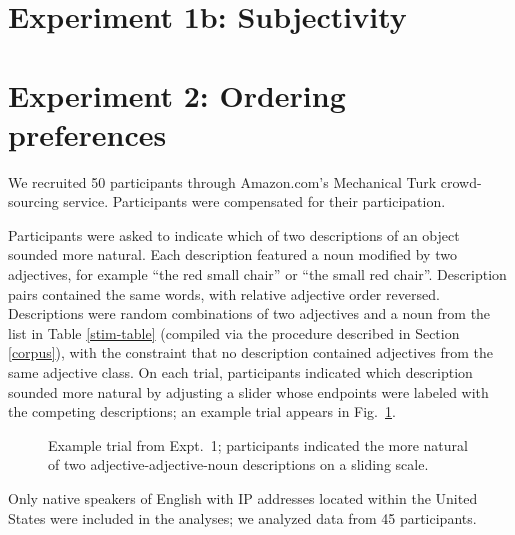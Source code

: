 \documentclass{pnastwo}
\begin{document}
\begin{article}
\begin{materials}
\section{Experiment 1b: Subjectivity}

\section{Experiment 2: Ordering preferences}
We recruited 50 participants through Amazon.com's Mechanical Turk crowd-sourcing service. Participants were compensated for their participation.

Participants were asked to indicate which of two descriptions of an object sounded more natural. Each description featured a noun modified by two adjectives, for example ``the red small chair'' or ``the small red chair''. Description pairs contained the same words, with relative adjective order reversed. Descriptions were random combinations of two adjectives and a noun from the list in Table \ref{stim-table} (compiled via the procedure described in Section \ref{corpus}), with the constraint that no description contained adjectives from the same adjective class.
On each trial, participants indicated which description sounded more natural by adjusting a slider whose endpoints were labeled with the competing descriptions; an example trial appears in Fig.\ \ref{order-trial}.

\begin{figure}[h!]
	\centering
	\caption{Example trial from Expt.\ 1; participants indicated the more natural of two adjective-adjective-noun descriptions on a sliding scale.}\label{order-trial}
\end{figure}

Only native speakers of English with IP addresses located within the United States were included in the analyses; we analyzed data from 45 participants.




\end{materials}
\end{article}
\end{document}
